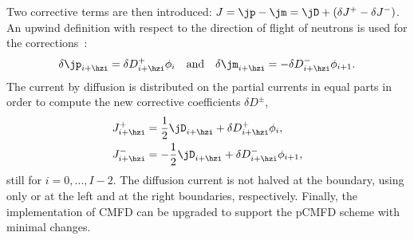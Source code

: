 Two corrective terms are then introduced: $J = \jp - \jm = \jD + \left(\delta J^+ - \delta J^-\right)$. An upwind definition with respect to the direction of flight of neutrons is used for the corrections~\cite{Jarrett-2016,Zhu-2016}:
\begin{equation}
\label{eq:CCF-sub}
\delta \jp _{i+\hzi} = \delta D^+ _{i+\hzi} \phi_i
\quad \text{and} \quad
\delta \jm _{i+\hzi} = -\delta D^- _{i+\hzi} \phi_{i+1}.
\end{equation}
The current by diffusion is distributed on the partial currents in equal parts in order to compute the new corrective coefficients $\delta D^{\pm}$,
\begin{subequations}
	\label{eq:delta-D-pCMFD}
	\begin{align}
	J^+_{i+\hzi} &= \frac{1}{2}\jD_{i+\hzi} + \delta D^+_{i+\hzi} \phi_i, \label{eq:delta-D-pCMFDp}\\
	J^-_{i+\hzi} &= - \frac{1}{2}\jD_{i+\hzi} + \delta D^-_{i+\hzi} \phi_{i+1}, \label{eq:delta-D-pCMFDm}
	\end{align}
\end{subequations}
still for $i=0, \ldots, I-2$. The diffusion current is not halved at the boundary, using only  or  at the left and at the right boundaries, respectively. Finally, the implementation of CMFD can be upgraded to support the pCMFD scheme with minimal changes.
%
%
